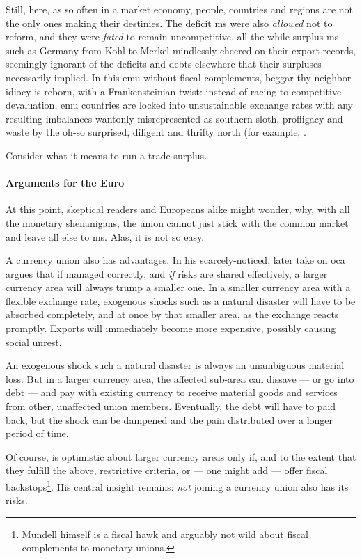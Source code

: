 Still, here, as so often in a market economy, people, countries and regions are not the only ones making their destinies.
The deficit \gls{ms} were also \emph{allowed} not to reform, and they were \emph{fated} to remain uncompetitive, all the while surplus \gls{ms} such as Germany from Kohl to Merkel mindlessly cheered on their export records, seemingly ignorant of the deficits and debts elsewhere that their surpluses necessarily implied.
In this \gls{emu} without fiscal complements, beggar-thy-neighbor idiocy is reborn, with a Frankensteinian twist:
instead of racing to competitive devaluation, \gls{emu} countries are locked into unsustainable exchange rates with any resulting imbalances wantonly misrepresented as southern sloth, profligacy and waste by the oh-so surprised, diligent and thrifty north (for example, \citep[200]{Featherstone2011}.

Consider what it means to run a trade surplus.

\paragraph{Arguments for the Euro}
At this point, skeptical readers and Europeans alike might wonder, why, with all the monetary shenanigans, the union cannot just stick with the common market and leave all else to \gls{ms}.
Alas, it is not so easy.

A currency union also has advantages.
In his scarcely-noticed, later take on \gls{oca} \cite{Mundell1972} argues that if managed correctly, and \emph{if} risks are shared effectively, a larger currency area will always trump a smaller one.
In a smaller currency area with a flexible exchange rate, exogenous shocks such as a natural disaster will have to be absorbed completely, and at once by that smaller area, as the exchange reacts promptly.
Exports will immediately become more expensive, possibly causing social unrest.

An exogenous shock such a natural disaster is always an unambiguous material loss.
But in a larger currency area, the affected sub-area can dissave --- or go into debt --- and pay with existing currency to receive material goods and services from other, unaffected union members.
Eventually, the debt will have to paid back, but the shock can be dampened and the pain distributed over a longer period of time.

Of course, \cite{Mundell1972} is optimistic about larger currency areas only if, and to the extent that they fulfill the above, restrictive criteria, or --- one might add --- offer fiscal backstops\footnote{
	Mundell himself is a fiscal hawk and arguably not wild about fiscal complements to monetary unions.}.
His central insight remains:
\emph{not} joining a currency union also has its risks.

